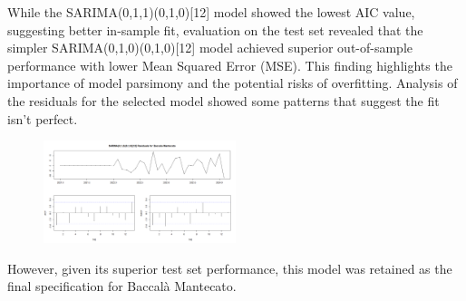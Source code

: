 \documentclass[10pt,twocolumn,letterpaper]{article}
\begin{document}
While the SARIMA(0,1,1)(0,1,0)[12] model showed the lowest AIC value, suggesting better in-sample fit, evaluation on the test set revealed that the simpler SARIMA(0,1,0)(0,1,0)[12] model achieved superior out-of-sample performance with lower Mean Squared Error (MSE). This finding highlights the importance of model parsimony and the potential risks of overfitting.
Analysis of the residuals for the selected model showed some patterns that suggest the fit isn't perfect.
\begin{figure}[H]
    \centering
    \includegraphics[width=0.5\textwidth]{PlotsBEFD/RES_ACF_SARIMA_MAN.png} 
    \caption{}
    \label{fig:esempio}
\end{figure}


However, given its superior test set performance, this model was retained as the final specification for Baccalà Mantecato.
\end{document}
